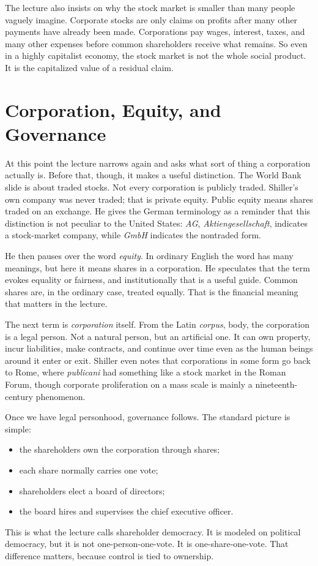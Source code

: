The lecture also insists on why the stock market is smaller than many people vaguely imagine. Corporate stocks are only claims on profits after many other payments have already been made. Corporations pay wages, interest, taxes, and many other expenses before common shareholders receive what remains. So even in a highly capitalist economy, the stock market is not the whole social product. It is the capitalized value of a residual claim.

\section{Corporation, Equity, and Governance}

At this point the lecture narrows again and asks what sort of thing a corporation actually is. Before that, though, it makes a useful distinction. The World Bank slide is about traded stocks. Not every corporation is publicly traded. Shiller's own company was never traded; that is private equity. Public equity means shares traded on an exchange. He gives the German terminology as a reminder that this distinction is not peculiar to the United States: \emph{AG}, \emph{Aktiengesellschaft}, indicates a stock-market company, while \emph{GmbH} indicates the nontraded form.

He then pauses over the word \emph{equity}. In ordinary English the word has many meanings, but here it means shares in a corporation. He speculates that the term evokes equality or fairness, and institutionally that is a useful guide. Common shares are, in the ordinary case, treated equally. That is the financial meaning that matters in the lecture.

The next term is \emph{corporation} itself. From the Latin \emph{corpus}, body, the corporation is a legal person. Not a natural person, but an artificial one. It can own property, incur liabilities, make contracts, and continue over time even as the human beings around it enter or exit. Shiller even notes that corporations in some form go back to Rome, where \emph{publicani} had something like a stock market in the Roman Forum, though corporate proliferation on a mass scale is mainly a nineteenth-century phenomenon.

Once we have legal personhood, governance follows. The standard picture is simple:
\begin{itemize}
\item the shareholders own the corporation through shares;
\item each share normally carries one vote;
\item shareholders elect a board of directors;
\item the board hires and supervises the chief executive officer.
\end{itemize}
This is what the lecture calls shareholder democracy. It is modeled on political democracy, but it is not one-person-one-vote. It is one-share-one-vote. That difference matters, because control is tied to ownership.

